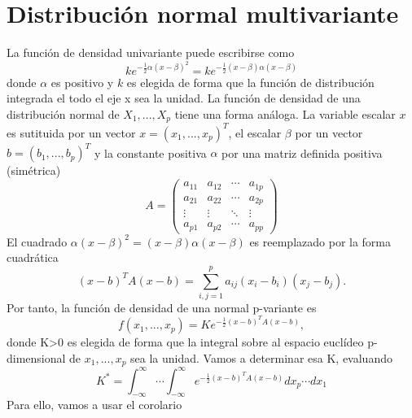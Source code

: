 \section{Distribución normal multivariante}
La función de densidad univariante puede escribirse como
\[ ke^{-\frac{1}{2}\alpha(x-\beta)^{2}}=ke^{-\frac{1}{2}(x-\beta)\alpha(x-\beta)} \]
donde $\alpha$ es positivo y $k$ es elegida de forma que la función de distribución integrada el todo el eje x sea la unidad. La función de densidad de una distribución normal de $X_{1},...,X_{p}$ tiene una forma análoga. La variable escalar $x$ es sutituida por un vector $x=(x_{1},...,x_{p})^{T}$, el escalar $\beta$ por un vector $b=(b_{1},...,b_p)^T$ y la constante positiva $\alpha$ por una matriz definida positiva (simétrica)
\begin{equation}
A=\begin{pmatrix}
a_{11} & a_{12} & \cdots & a_{1p}\\
a_{21} & a_{22} & \cdots & a_{2p}\\
\vdots & \vdots & \ddots & \vdots\\
a_{p1} & a_{p2} & \cdots & a_{pp}
\end{pmatrix}
\end{equation} 
El cuadrado $\alpha(x-\beta)^2=(x-\beta)\alpha(x-\beta)$ es reemplazado por la forma cuadrática
\[ (x-b)^T A (x-b) = \sum_{i,j=1}^{p}a_{ij}(x_i-b_i)(x_j-b_j). \]
Por tanto, la función de densidad de una normal p-variante es
\[ f(x_1,...,x_p)=Ke^{-\frac{1}{2}(x-b)^T A (x-b)} ,\]
donde K>0 es elegida de forma que la integral sobre al espacio euclídeo p-dimensional de $x_1,...,x_p$ sea la unidad. Vamos a determinar esa K, evaluando
\[ K^* = \int_{-\infty}^{\infty} \dotsb \int_{-\infty}^{\infty} e^{-\frac{1}{2}(x-b)^T A (x-b)} dx_p \dotsb dx_1 \]
Para ello, vamos a usar el corolario

\cite{anderson1958introduction}
























\endinput

